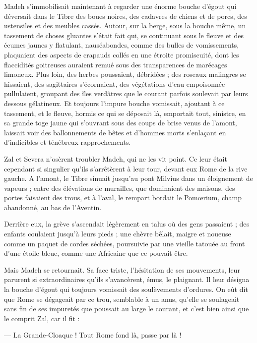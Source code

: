 \documentclass[a4paper, 11pt, oneside, polutonikogreek, french]{article}
\begin{document}
Madeh s'immobilisait maintenant à regarder une énorme bouche d'égout qui déversait dans le Tibre des boues noires, des cadavres de chiens et de porcs, des ustensiles et des meubles cassés. Autour, sur la berge, sous la bouche même, un tassement de choses gluantes s'était fait qui, se continuant sous le fleuve et des écumes jaunes y flatulant, nauséabondes, comme des bulles de vomissements, plaquaient des aspects de crapauds collés en une étroite promiscuité, dont les flaccidités goitreuses auraient remué sous des transparences de marécages limoneux. Plus loin, des herbes poussaient, débridées ; des roseaux malingres se hissaient, des sagittaires s'écornaient, des végétations d'eau empoisonnée pullulaient, groupant des îles verdâtres que le courant parfois soulevait par leurs dessous gélatineux. Et toujours l'impure bouche vomissait, ajoutant à ce tassement, et le fleuve, hormis ce qui se déposait là, emportait tout, sinistre, en sa grande toge jaune qui s'ouvrant sous des coups de brise venus de l'amont, laissait voir des ballonnements de bêtes et d'hommes morts s'enlaçant en d'indicibles et ténébreux rapprochements.

Zal et Severa n'osèrent troubler Madeh, qui ne les vit point. Ce leur était cependant si singulier qu'ils s'arrêtèrent à leur tour, devant eux Rome de la rive gauche. A l'amont, le Tibre sinuait jusqu'au pont Milvius dans un éloignement de vapeurs ; entre des élévations de murailles, que dominaient des maisons, des portes faisaient des trous, et à l'aval, le rempart bordait le Pomœrium, champ abandonné, au bas de l'Aventin.

Derrière eux, la grève s'ascendait légèrement en talus où des gens passaient ; des enfants coulaient jusqu'à leurs pieds ; une chèvre bêlait, maigre et noueuse comme un paquet de cordes séchées, poursuivie par une vieille tatouée au front d'une étoile bleue, comme une Africaine que ce pouvait être.

Mais Madeh se retournait. Sa face triste, l'hésitation de ses mouvements, leur parurent si extraordinaires qu'ils s'avancèrent, émus, le plaignant. Il leur désigna la bouche d'égout qui toujours vomissait des soulèvements d'ordures. On eût dit que Rome se dégageait par ce trou, semblable à un anus, qu'elle se soulageait sans fin de ses impuretés que poussait au large le courant, et c'est bien ainsi que le comprit Zal, car il fit :

--- La Grande-Cloaque ! Tout Rome fond là, passe par là !
\end{document}
